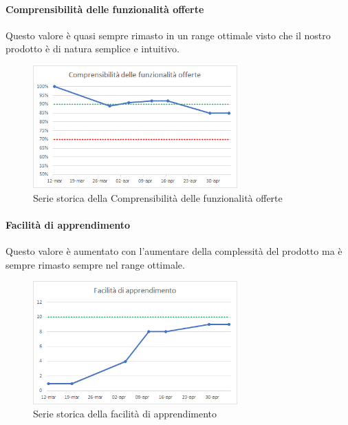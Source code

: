     \paragraph{Comprensibilità delle funzionalità offerte} \Spazio
    Questo valore è quasi sempre rimasto in un range ottimale visto che il nostro prodotto è di natura semplice e intuitivo.
    \begin{figure}[H]
    	\centering 
    	\includegraphics[width=0.7\textwidth]{Images/compr.png}
    	\caption{Serie storica della Comprensibilità delle funzionalità offerte}
    	\label{compr} 
    \end{figure}
    \paragraph{Facilità di apprendimento} \Spazio
    Questo valore è aumentato con l'aumentare della complessità del prodotto ma è sempre rimasto sempre nel range ottimale.
    \begin{figure}[H]
    	\centering 
    	\includegraphics[width=0.7\textwidth]{Images/fac.png}
    	\caption{Serie storica della facilità di apprendimento}
    	\label{fac} 
    \end{figure}
